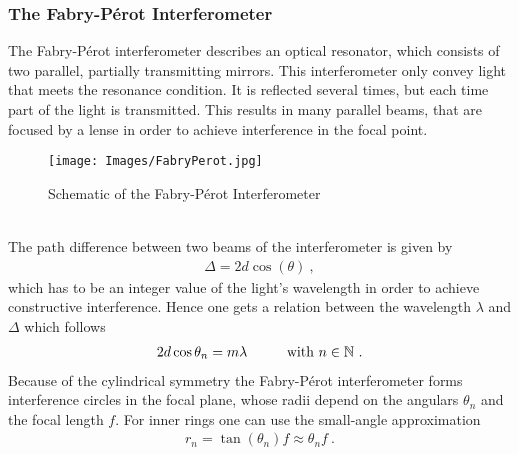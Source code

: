 \subsubsection{The Fabry-P\'erot Interferometer}
\label{toc:FabryPerot}
The Fabry-P\'erot interferometer describes an optical resonator, which consists of two parallel, partially transmitting mirrors. 
This interferometer only convey light that meets the resonance condition. It is reflected several times, but each time part of the light is transmitted. 
This results in many parallel beams, that are focused by a lense in order to achieve interference in the focal point. 
	\begin{figure}[ht]
		\centering
		\texttt{[image: Images/FabryPerot.jpg]}
		\caption[Schematic of the Fabry-P\'erot Interferometer]{Schematic of the Fabry-P\'erot Interferometer \cite{FabryPerot}}
		\label{fig:FabryPerot}
	\end{figure}\\
The path difference between two beams of the interferometer is given by
	\begin{align}
		\Delta = 2d\cos(\theta)\ ,
	\end{align}
which has to be an integer value of the light's wavelength in order to achieve constructive interference. 
Hence one gets a relation between the wavelength $\lambda$ and $\Delta$ which follows
	\begin{align}
		2d\cos{\theta_n} = m\lambda \hspace{1.0cm} \text{with } n \in \mathbb{N}\ .
		\label{eq:ConstructiveInterferenceFabry}
	\end{align}
Because of the cylindrical symmetry the Fabry-P\'erot interferometer forms interference circles in the focal plane, whose radii depend on the angulars $\theta_n$ and the focal length $f$. 
For inner rings one can use the small-angle approximation
	\begin{align}
		\label{eq:FocussalRadius}
 		r_n = \tan(\theta_n)f \approx \theta_n f\ .
	\end{align}
